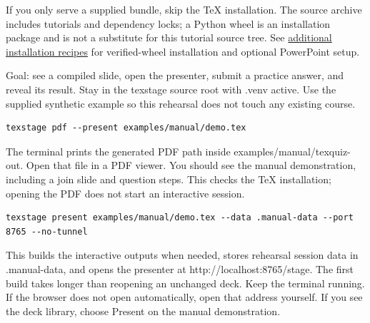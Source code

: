 \documentclass[a4paper,11pt]{article}
\begin{document}
If you only serve a supplied bundle, skip the TeX installation.\allowbreak{} The source archive includes tutorials and dependency locks; a Python wheel is an installation package and is not a substitute for this tutorial source tree.\allowbreak{} See \href{\manualdocroot installation-advanced.md}{additional installation recipes} for verified-\allowbreak{}wheel installation and optional PowerPoint setup.\par

\label{sec:start-your-first-session}
Goal: see a compiled slide, open the presenter, submit a practice answer, and reveal its result.\allowbreak{} Stay in the texstage source root with .\allowbreak{}venv active.\allowbreak{} Use the supplied synthetic example so this rehearsal does not touch any existing course.\par

\par\noindent\begin{minipage}{\linewidth}
\begin{Verbatim}
texstage pdf --present examples/manual/demo.tex
\end{Verbatim}
\end{minipage}\par\smallskip

The terminal prints the generated PDF path inside examples/\allowbreak{}manual/\allowbreak{}texquiz-\allowbreak{}out.\allowbreak{} Open that file in a PDF viewer.\allowbreak{} You should see the manual demonstration, including a join slide and question steps.\allowbreak{} This checks the TeX installation; opening the PDF does not start an interactive session.\par

\par\noindent\begin{minipage}{\linewidth}
\begin{Verbatim}
texstage present examples/manual/demo.tex --data .manual-data --port 8765 --no-tunnel
\end{Verbatim}
\end{minipage}\par\smallskip

This builds the interactive outputs when needed, stores rehearsal session data in .\allowbreak{}manual-\allowbreak{}data, and opens the presenter at http:/\allowbreak{}/\allowbreak{}localhost:8765/\allowbreak{}stage.\allowbreak{} The first build takes longer than reopening an unchanged deck.\allowbreak{} Keep the terminal running.\allowbreak{} If the browser does not open automatically, open that address yourself.\allowbreak{} If you see the deck library, choose Present on the manual demonstration.\par
\end{document}
